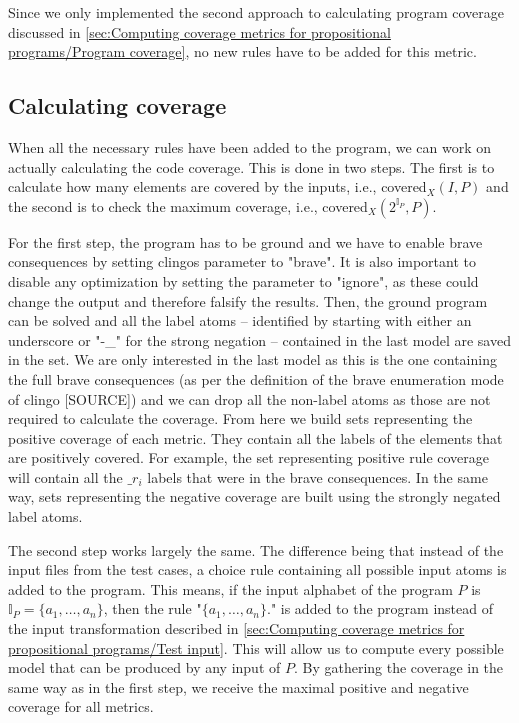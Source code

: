 Since we only implemented the second approach to calculating program coverage discussed in \cref{sec:Computing coverage metrics for propositional programs/Program coverage}, no new rules have to be added for this metric.

\subsection{Calculating coverage}
\label{subsec:Computing coverage metrics for propositional programs/Implementation details/Calculating coverage}
When all the necessary rules have been added to the program, we can work on actually calculating the code coverage. This is done in two steps. The first is to calculate how many elements are covered by the inputs, i.e., covered\(_X(I, P)\) and the second is to check the maximum coverage, i.e., covered\(_X(2^{\mathbb{I}_P}, P)\). 

For the first step, the program has to be ground and we have to enable brave consequences by setting clingos  parameter to "brave". It is also important to disable any optimization by setting the  parameter to "ignore", as these could change the output and therefore falsify the results. Then, the ground program can be solved and all the label atoms -- identified by starting with either an underscore or "-\_" for the strong negation -- contained in the last model are saved in the  set. We are only interested in the last model as this is the one containing the full brave consequences (as per the definition of the brave enumeration mode of clingo [SOURCE]) and we can drop all the non-label atoms as those are not required to calculate the coverage. From here we build sets representing the positive coverage of each metric. They contain all the labels of the elements that are positively covered. For example, the set representing positive rule coverage will contain all the $\_r_i$ labels that were in the brave consequences. In the same way, sets representing the negative coverage are built using the strongly negated label atoms.

The second step works largely the same. The difference being that instead of the input files from the test cases, a choice rule containing all possible input atoms is added to the program. This means, if the input alphabet of the program $P$ is \(\mathbb{I}_P = \{a_1, \ldots, a_n\}\), then the rule "\(\{a_1, \ldots, a_n\}.\)" is added to the program instead of the input transformation described in \cref{sec:Computing coverage metrics for propositional programs/Test input}. This will allow us to compute every possible model that can be produced by any input of $P$. By gathering the coverage in the same way as in the first step, we receive the maximal positive and negative coverage for all metrics.

